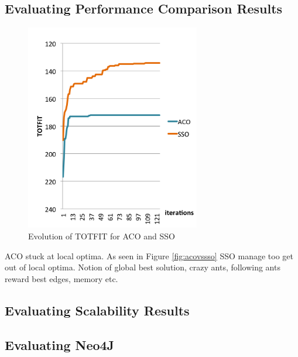 \subsection{Evaluating Performance Comparison Results}

 \begin{figure}[H]
    \begin{center}
    \includegraphics[width=3in]{assets/acovsssoNEW.png}
    \end{center}
    \caption{Evolution of TOTFIT for ACO and SSO }
    \label{fig:acovssso} 
    \end{figure}

ACO stuck at local optima. As seen in Figure \vref{fig:acovssso} SSO manage too get out of local optima. Notion of global best solution, crazy ants, following ants reward best edges, memory etc.

\subsection{Evaluating Scalability Results}
\subsection{Evaluating Neo4J}


